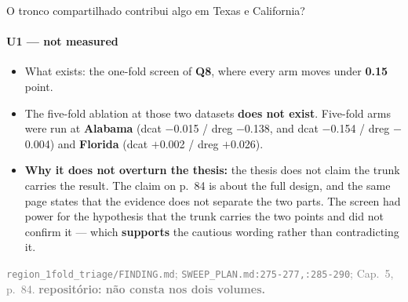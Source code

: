 \documentclass{beamer}
\begin{document}
\begin{frame}[noframenumbering]{O tronco compartilhado contribui algo em Texas e California?}
    \framesubtitle{U1 --- not measured}
    \hypertarget{u1}{}
    \small
    \begin{itemize}\setlength{\itemsep}{0pt}\setlength{\parskip}{0pt}
        \item What exists: the one-fold screen of \textbf{Q8}, where every arm moves under \textbf{0.15} point.
        \item The five-fold ablation at those two datasets \textbf{does not exist}. Five-fold arms were run at \textbf{Alabama} (dcat $-$0.015 / dreg $-$0.138, and dcat $-$0.154 / dreg $-$0.004) and \textbf{Florida} (dcat $+$0.002 / dreg $+$0.026).
        \item \textbf{Why it does not overturn the thesis:} the thesis does not claim the trunk carries the result. The claim on p.~84 is about the full design, and the same page states that the evidence does not separate the two parts. The screen had power for the hypothesis that the trunk carries the two points and did not confirm it --- which \textbf{supports} the cautious wording rather than contradicting it.
    \end{itemize}
    \vfill
    {\scriptsize
    \begin{minipage}[b]{0.775\linewidth}\raggedright\textcolor{gray}{\texttt{region\_1fold\_triage/FINDING.md}; \texttt{SWEEP\_PLAN.md:275-277,:285-290}; Cap.~5, p.~84. \textbf{repositório: não consta nos dois volumes.}}\end{minipage}\hfill
    \begin{minipage}[b]{0.20\linewidth}\raggedleft \hyperlink{q8}{}\hyperlink{b0}{}\end{minipage}}
\end{frame}
\end{document}

